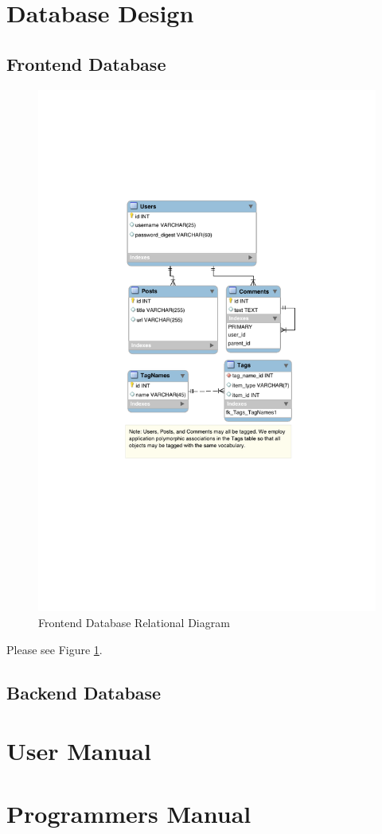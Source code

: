 \documentclass[11pt,letterpaper]{article}
\begin{document}
\section{Database Design}
\subsection{Frontend Database}
\begin{figure}
\centering
\includegraphics{db_diagram.pdf}
\caption{Frontend Database Relational Diagram}
\label{fig:database}
\end{figure}
Please see Figure \ref{fig:database}.
\subsection{Backend Database}

\section{User Manual}

\section{Programmers Manual}
\end{document}

